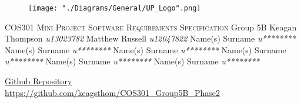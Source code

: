 \begin{titlepage}
\begin{center}
\begin{figure}[t]
\centering
\texttt{[image: "./Diagrams/General/UP\_Logo".png]}
\end{figure}
\begin{flushright}
\textsc{\LARGE COS301 Mini Project \newline\newline Software Requirements \newline   Specification}
\newline\newline \Large Group 5B \newline\newline
\large
Keagan Thompson    \emph{u13023782} \newline
Matthew Russell    \emph{u12047822} \newline
Name(s) Surname    \emph{u********} \newline
Name(s) Surname    \emph{u********} \newline
Name(s) Surname    \emph{u********} \newline
Name(s) Surname    \emph{u********} \newline
Name(s) Surname    \emph{u********} \newline
Name(s) Surname    \emph{u********} \newline
\end{flushright}
\vfill
\href{https://github.com/keagsthom/COS301_Group5B_Phase2}{Github Repository}\\
\url{https://github.com/keagsthom/COS301_Group5B_Phase2}
\end{center}
\end{titlepage}